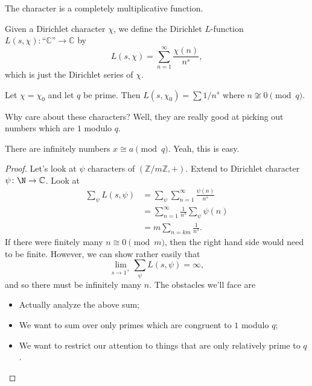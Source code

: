 The character is a completely multiplicative function.

\begin{definition}[$L$-function]
	Given a Dirichlet character $\chi$, we define the Dirichlet $L$-function 
	$L(s,\chi)\colon \text{``$\mathbb{C}$''} \to \mathbb{C}$ by 
	\[ 
		L(s,\chi) = \sum_{n=1}^\infty \frac{\chi(n)}{n^s},
	\]
	which is just the Dirichlet series of $\chi$.
\end{definition}

\begin{example}
	Let $\chi = \chi_0$ and let $q$ be prime.
	Then $L(s, \chi_0) = \sum 1/n^s$ where $n \not\cong 0 \pmod{q}$.
\end{example}

\begin{remark*}
	Why care about these characters? Well, they are really good at picking out
	numbers which are $1$ modulo $q$.
\end{remark*}

\begin{theorem*}
	There are infinitely numbers $x \cong a \pmod{q}$.
	Yeah, this is easy.
\end{theorem*}

\begin{proof}
	Let's look at $\psi$ characters of $(\mathbb{Z}/m\mathbb{Z}, +)$.
	Extend to Dirichlet character $\psi\colon \N \to \mathbb{C}$.
	Look at 
	\begin{align*}
		\sum_{\psi} L(s,\psi) &= \sum_\psi \sum_{n=1}^\infty \frac{\psi(n)}{n^s} \\
							&= \sum_{n=1}^\infty \frac{1}{n^s}\sum_\psi \psi(n) \\
							  &= m \sum_{n =km } \frac{1}{n^s}.
	\end{align*}
	If there were finitely many $n \cong 0 \pmod{m}$, then the right hand side
	would need to be finite.
	However, we can show rather easily that
	\[ \lim_{s \to 1^+} \sum_\psi L(s,\psi) = \infty, \]
	and so there must be infinitely many $n$.
	The obstacles we'll face are 
	\begin{itemize}
		\item Actually analyze the above sum;
		\item We want to sum over only primes which are congruent to $1$ modulo
		$q$;
		\item We want to restrict our attention to things that are only 
		relatively prime to $q$.
	\end{itemize}
\end{proof}

